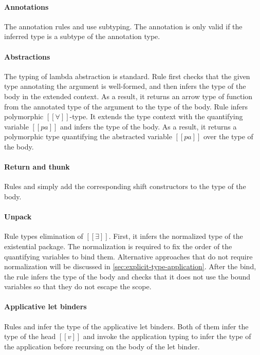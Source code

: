 \paragraph{Annotations}
  The annotation rules 
  and  use subtyping.
  The annotation is only valid if the
  inferred type is a subtype of the annotation type.

\paragraph{Abstractions}
  The typing of lambda abstraction is standard. 
  Rule  first checks
  that the given type annotating the argument is well-formed,
  and then infers the type of the body in the extended context.
  As a result, it returns an arrow type of function from the
  annotated type of the argument to the type of the body.
  Rule  infers polymorphic $[[∀]]$-type. 
  It extends the type context with the quantifying variable $[[pa]]$ and 
  infers the type of the body. As a result, it returns a polymorphic type
  quantifying the abstracted variable $[[pa]]$ over the type of the body.

\paragraph{Return and thunk}
  Rules  
  and 
  simply add the corresponding shift constructors to the type of the body.

\paragraph{Unpack}
  Rule  types elimination of $[[∃]]$.
  First, it infers the normalized type of the existential package.
  The normalization is required to fix the order of the quantifying variables
  to bind them. Alternative approaches that do not require normalization
  will be discussed in \cref{sec:explicit-type-application}.
  After the bind, the rule infers the type of the body 
  and checks that it does not use the bound variables so that they do not 
  escape the scope.

\paragraph{Applicative let binders}
  Rules  and 
  infer the type of the applicative let binders.
  Both of them infer the type of the head $[[v]]$ 
  and invoke the application typing to infer the type of the application 
  before recursing on the body of the let binder.

